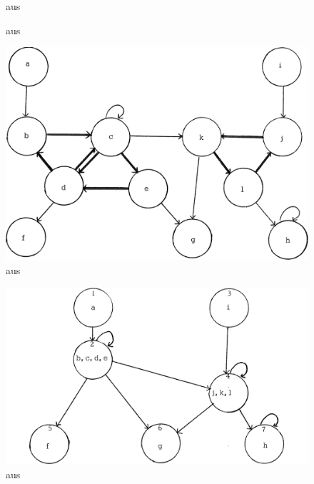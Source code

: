 \begin{figure}[H]
    \centering
    \setlength{\fboxsep}{10pt}\color{black!20}
    \normalcolor\caption{aus \citep[Seite 172]{gross2013handbook}}
\end{figure}

\begin{figure}[H]
    \centering
    \setlength{\fboxsep}{10pt}\color{black!20}
    \normalcolor\caption{aus \citep[Seite 76f]{dar1993augmenting}}
\end{figure}

\newpage

\begin{figure}[H]
    \centering
    \includegraphics[width=.48\linewidth]{../img/purdom_g1.png}
    \caption{aus \citep[Seite 78]{purdom1970transitive}}
\end{figure}

\begin{figure}[H]
    \centering
    \includegraphics[width=.45\linewidth]{../img/purdom_g2.png}
    \caption{aus \citep[Seite 78]{purdom1970transitive}}
\end{figure}

